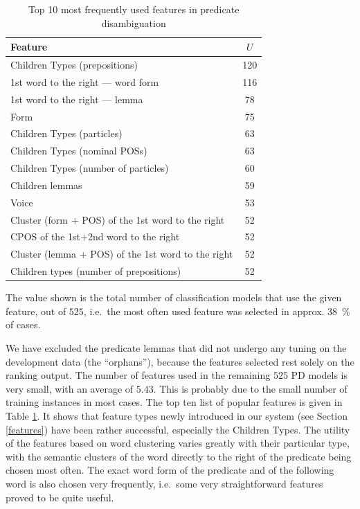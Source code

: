 \documentclass[12pt,notitlepage,a4paper]{report}
\begin{document}
\begin{table}[htb]\footnotesize
\caption{Top 10 most frequently used features in predicate disambiguation}\label{tab:feats-pd}
\begin{center}
\begin{tabular}{|l|c|}\hline
\bf Feature & \bf $U$ \\\hline
Children Types (prepositions) & 120 \\
1st word to the right --- word form & 116 \\
1st word to the right --- lemma & 78 \\
Form & 75 \\
Children Types (particles) & 63 \\
Children Types (nominal POSs) & 63 \\
Children Types (number of particles) & 60 \\
Children lemmas & 59 \\
Voice & 53 \\
Cluster (form + POS) of the 1st word to the right & 52 \\
CPOS of the 1st+2nd word to the right & 52 \\
Cluster (lemma + POS) of the 1st word to the right & 52 \\
Children types (number of prepositions) & 52 \\\hline
\end{tabular}
\end{center}
The value shown is the total number of classification models that use the given feature, out of $525$, i.e.\ the most often used feature was selected in approx. 38~\% of cases.
\end{table}

We have excluded the predicate lemmas that did not undergo any tuning on the development data (the ``orphans''), because the features selected rest solely on the ranking output. The number of features used in the remaining $525$ PD models is very small, with an average of $5.43$. This is probably due to the small number of training instances in most cases. The top ten list of popular features is given in Table \ref{tab:feats-pd}. It shows that feature types newly introduced in our system (see Section \ref{features}) have been rather successful, especially the Children Types. The utility of the features based on word clustering varies greatly with their particular type, with the semantic clusters of the word directly to the right of the predicate being chosen most often. The exact word form of the predicate and of the following word is also chosen very frequently, i.e.\ some very straightforward features proved to be quite useful.
\end{document}
